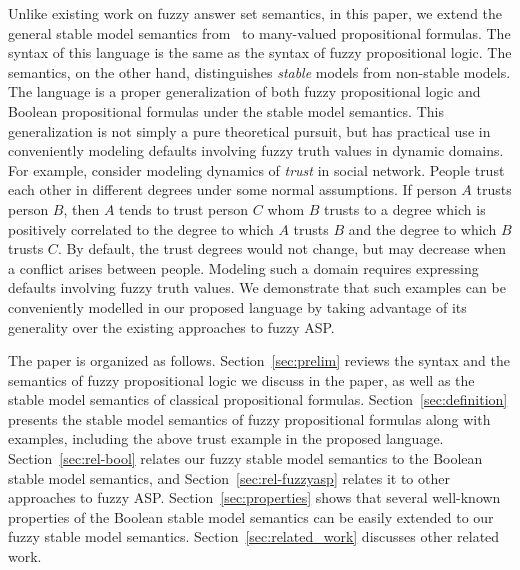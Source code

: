 \documentclass[runningheads]{llncs}
\begin{document}
Unlike existing work on fuzzy answer set semantics, in this paper, we
extend the general stable model semantics from~\cite{ferraris11stable}
to many-valued propositional formulas. The syntax of this language is
the same as the syntax of fuzzy propositional logic. The semantics, on
the other hand, distinguishes {\sl stable} models from non-stable models.
The language is a proper generalization of both fuzzy propositional logic and Boolean propositional formulas under the stable model semantics.
This generalization is not simply a pure theoretical pursuit, but has
practical use in conveniently modeling defaults involving fuzzy truth
values in dynamic domains. For example, consider modeling dynamics of
{\em trust} in social
network. People trust each other in different degrees under some
normal assumptions. If person $A$ trusts person $B$, then $A$
tends to trust person $C$ whom $B$ trusts to a degree which is
positively correlated to the degree to which $A$ trusts $B$ and the
degree to which $B$ trusts $C$. By default, the trust degrees
would not change, but may decrease when a conflict arises between people.
Modeling such a domain requires expressing defaults involving fuzzy
truth values. We demonstrate that such examples can be conveniently
modelled in our proposed language by taking advantage of its
generality over the existing approaches to fuzzy ASP.


The paper is organized as follows. Section~\ref{sec:prelim} reviews
the syntax and the semantics of fuzzy propositional logic
we discuss in the paper, as well as the stable model semantics of
classical propositional formulas. Section~\ref{sec:definition}
presents the stable model semantics of fuzzy propositional formulas
along with examples, including the above
trust example in the proposed language. 
Section~\ref{sec:rel-bool}  relates our fuzzy stable model semantics
to the Boolean stable model semantics, and
Section~\ref{sec:rel-fuzzyasp} relates it to other approaches to fuzzy ASP. Section~\ref{sec:properties} shows that several well-known properties
of the Boolean stable model semantics can be easily extended to our fuzzy
stable model semantics. Section~\ref{sec:related_work} discusses other
related work.
\end{document}
